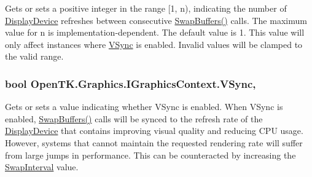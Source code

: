 Gets or sets a positive integer in the range \mbox{[}1, n), indicating the number of \hyperlink{class_open_t_k_1_1_display_device}{Display\-Device} refreshes between consecutive \hyperlink{interface_open_t_k_1_1_graphics_1_1_i_graphics_context_ad7d516da745576542161f1baa5f20129}{Swap\-Buffers()} calls. The maximum value for n is implementation-\/dependent. The default value is 1. This value will only affect instances where \hyperlink{interface_open_t_k_1_1_graphics_1_1_i_graphics_context_ad02e5a60e13f6ed668b8075ead268cb6}{V\-Sync} is enabled. Invalid values will be clamped to the valid range. 

\hypertarget{interface_open_t_k_1_1_graphics_1_1_i_graphics_context_ad02e5a60e13f6ed668b8075ead268cb6}{
\subsubsection[{V\-Sync}]{\setlength{\rightskip}{0pt plus 5cm}bool Open\-T\-K.\-Graphics.\-I\-Graphics\-Context.\-V\-Sync\hspace{0.3cm}{\ttfamily [get]}, {\ttfamily [set]}}}\label{interface_open_t_k_1_1_graphics_1_1_i_graphics_context_ad02e5a60e13f6ed668b8075ead268cb6}


Gets or sets a value indicating whether V\-Sync is enabled. When V\-Sync is enabled, \hyperlink{interface_open_t_k_1_1_graphics_1_1_i_graphics_context_ad7d516da745576542161f1baa5f20129}{Swap\-Buffers()} calls will be synced to the refresh rate of the \hyperlink{class_open_t_k_1_1_display_device}{Display\-Device} that contains improving visual quality and reducing C\-P\-U usage. However, systems that cannot maintain the requested rendering rate will suffer from large jumps in performance. This can be counteracted by increasing the \hyperlink{interface_open_t_k_1_1_graphics_1_1_i_graphics_context_acdd6cc5339e7d0d428f4aa59b560940f}{Swap\-Interval} value. 

